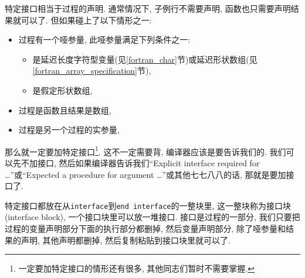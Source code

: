 特定接口相当于过程的声明. 通常情况下, 子例行不需要声明, 函数也只需要声明结果就可以了. 但如果碰上了以下情形之一:
\begin{itemize}
    \item 过程有一个哑参量, 此哑参量满足下列条件之一:\begin{itemize}
        \item 是延迟长度字符型变量(见\ref{fortran_char}节)或延迟形状数组(见\ref{fortran_array_specification}节),
        \item 是假定形状数组,
    \end{itemize}
    \item 过程是函数且结果是数组,
    \item 过程是另一个过程的实参量,
\end{itemize}
那么就一定要加特定接口\footnote{一定要加特定接口的情形还有很多, 其他同志们暂时不需要掌握.}. 这不一定需要背, 编译器应该是要告诉我们的. 我们可以先不加接口, 然后如果编译器告诉我们``Explicit interface required for \dots''或``Expected a procedure for argument \dots''或其他七七八八的话, 那就是要加接口了.

特定接口都放在从\verb|interface|到\verb|end interface|的一整块里, 这一整块称为接口块(interface block), 一个接口块里可以放一堆接口. 接口是过程的一部分, 我们只要把过程的变量声明部分下面的执行部分都删掉, 然后变量声明部分, 除了哑参量和结果的声明, 其他声明都删掉, 然后复制粘贴到接口块里就可以了.

